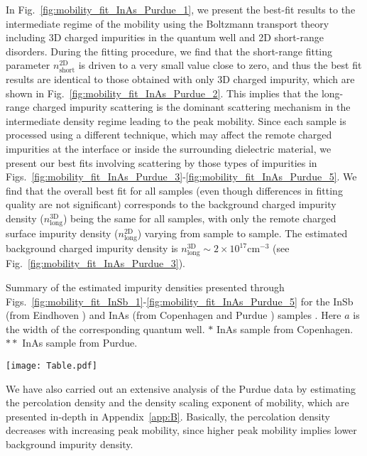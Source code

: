 \documentclass[aps,prmaterials,twocolumn,superscriptaddress,longbibliography]{revtex4-2}
\begin{document}
In Fig.~\ref{fig:mobility_fit_InAs_Purdue_1}, we present the best-fit results to the intermediate regime of the mobility using the Boltzmann transport theory including 3D charged impurities in the quantum well and 2D short-range disorders. During the fitting procedure, we find that the short-range fitting parameter $n^\mathrm{2D}_\mathrm{short}$ is driven to a very small value close to zero, and thus the best fit results are identical to those obtained with only 3D charged impurity, which are shown in Fig.~\ref{fig:mobility_fit_InAs_Purdue_2}. This implies that the long-range charged impurity scattering is the dominant scattering mechanism in the intermediate density regime leading to the peak mobility. 
Since each sample is processed using a different technique,  which may affect the remote charged impurities at the interface or inside the surrounding dielectric material, we present our best fits involving scattering by those types of impurities in Figs.~\ref{fig:mobility_fit_InAs_Purdue_3}-\ref{fig:mobility_fit_InAs_Purdue_5}. We find that the overall best fit for all samples (even though differences in fitting quality are not significant) corresponds to the background charged impurity density ($n^\mathrm{3D}_\mathrm{long}$) being the same for all samples,  with only the remote charged surface impurity density ($n^\mathrm{2D}_\mathrm{long}$) varying from sample to sample. The estimated background charged impurity density  is $n^\mathrm{3D}_\mathrm{long}\sim2\times 10^{17} \mathrm{cm^{-3}}$ (see Fig.~\ref{fig:mobility_fit_InAs_Purdue_3}).

\begin{table*}[t]
    
	\caption{Summary of the estimated impurity densities presented through Figs.~\ref{fig:mobility_fit_InSb_1}-\ref{fig:mobility_fit_InAs_Purdue_5} for the InSb (from Eindhoven \cite{gazibegovic2019bottomup}) and InAs (from Copenhagen \cite{beznasyuk2021role} and Purdue \cite{pauka2020repairing}) samples . Here $a$ is the width of the corresponding quantum well.
	$*$ InAs sample from Copenhagen.
	$**$ InAs sample from Purdue. }
	\label{table:summary_disorder}
	\texttt{[image: Table.pdf]}
\end{table*}

We have also carried out an extensive analysis of the Purdue data by estimating the percolation density and the density scaling exponent of mobility, which are presented in-depth in Appendix~\ref{app:B}.  Basically, the percolation density decreases with increasing peak mobility, since higher peak mobility implies lower background impurity density. 
\end{document}
